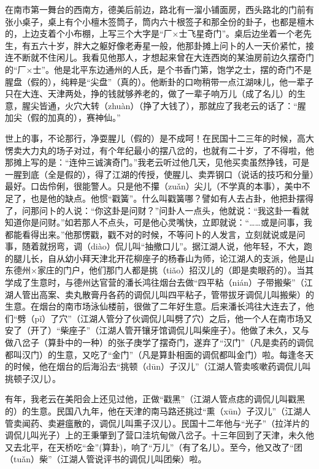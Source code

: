 \documentclass[12pt,UTF8]{ctexbook}
\begin{document}
在南市第一舞台的西南方，德美后前边，路北有一溜小铺面房，西头路北的门前有张小桌子，桌上有个小檀木签筒子，筒内六十根签子和那全份的卦子，也都是檀木的，上边支着个小布棚，上写三个大字是“厂×士飞星奇门”。桌后边坐着一个老先生，有五六十岁，胖大之躯好像老寿星一般，他那卦摊上问卜的人一天价紧忙，接连不断就不住闲儿。我看见他那人，才想起来曾在大连西岗的某油房前边久摆奇门的“厂×士”。他是北平东边通州的人氏，是个书香门第，饱学之士，摆的奇门不是腥盘（假的），纯粹是“尖盘”（真的）。他断卦的口吻稍带一点江湖味儿，他一辈子只在大连、天津两处，挣的钱就够养老的，做了一辈子响万儿（成了名儿）的生意，腥尖皆通，火穴大转（zhuàn）（挣了大钱了），那就应了我老云的话了：“腥加尖（假的加真的），赛神仙。”

世上的事，不论那行，净耍腥儿（假的）是不成呵！在民国十二三年的时候，高大愣卖大力丸的场子对过，有个年纪最小的摆八岔的，也就有二十岁，了不得啦，他那摊上写的是：“连仲三诚演奇门。”我老云听过他几天，见他买卖虽然挣钱，可是一腥到底（全是假的），得了江湖的传授，使腥儿、卖弄钢口（说话的技巧和分量）最好。口齿伶俐，很能警人。只是他不攥（zuǎn）尖儿（不学真的本事），美中不足了，也是他的缺点。他惯“戳簧”。什么叫戳簧哪？譬如有人去占卦，他把卦摆得了，问那问卜的人说：“你这卦是问财？”问卦人一点头，他就说：“我这卦一看就知道你是问财。”如若那人不点头，可是他心灵嘴快，立即就说：“……或是问事，我都能看得出来。”他那愣戳，戳不对的时候，不等问卜的人发言，立刻就说或是问事，随着就拐弯，调（diào）侃儿叫“抽撤口儿”。据江湖人说，他年轻，不大，跑的腿儿长，自从幼小拜天津北开花柳座子的杨春山为师，论江湖人的支派，他是山东德州×家庄的门户，他们那门人都是挑（tiǎo）招汉儿的（即是卖眼药的）。当其学成了生意时，与德州达官营的潘长鸿往烟台去做“四平粘（nián）子带搬柴”（江湖人管出高案、卖丸散膏丹各药的调侃儿叫四平粘子，管带拔牙调侃儿叫搬柴）的生意。在烟台的南市场泳仙楼前，很做了二年好生意。后来潘长鸿往大连去了，他们“劈（pǐ）了穴”（江湖人管分了伙调侃儿叫劈了穴）之后，他一个人在南市场又安了（开了）“柴座子”（江湖人管开镶牙馆调侃儿叫柴座子）。他做了未久，又与做八岔子（算卦中的一种）的张子庚学了摆奇门，遂弃了“汉门”（凡是卖药的调侃都叫汉门）的生意，又吃了“金门”（凡是算卦相面的调侃都叫金门）啦。每逢冬天的时候，他在烟台的后海沿去“挑顿（dūn）子汉儿”（江湖人管卖咳嗽药调侃儿叫挑顿子汉儿）。

有年，我老云在美阳会上还见过他，正做“戳黑”（江湖人管点痣的调侃儿叫戳黑的）的生意。民国八九年，他在天津的南马路还挑过“熏（xūn）子汉儿”（江湖人管卖闻药、卖避瘟散的，调侃儿叫熏子汉儿）。民国十二年他与“光子”（拉洋片的调侃儿叫光子）上的王秉肇到了营口洼坑甸做八岔子。十三年回到了天津，未久他又去北平，在天桥吃“金”(算卦)，响了“万儿”（有了名儿）。至今，他又改了“团（tuǎn）柴”（江湖人管说评书的调侃儿叫团柴）啦。
\end{document}
